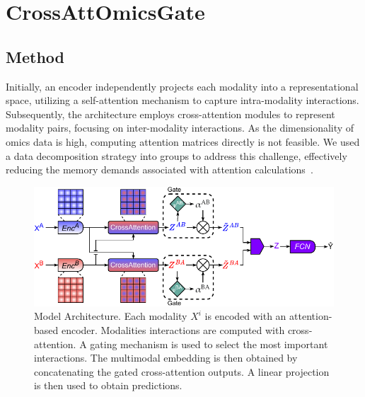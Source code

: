 \documentclass[../main.tex]{subfiles}
\begin{document}
\chapter{CrossAttOmicsGate}\label{chap:crossattomicsgate}
\minitocpage

\section{Method}
	Initially, an encoder independently projects each modality into a representational space, utilizing a self-attention mechanism to capture intra-modality interactions.
	Subsequently, the architecture employs cross-attention modules to represent modality pairs, focusing on inter-modality interactions.
	As the dimensionality of omics data is high, computing attention matrices directly is not feasible.
	We used a data decomposition strategy into groups to address this challenge, effectively reducing the memory demands associated with attention calculations~\cite{AttOmics}.

	\begin{figure}[htbp]
		\centering
		\includegraphics[width=\textwidth]{CrossAttOmicsGate.pdf}
		\caption[CrossAttOmicsGate architecture]{Model Architecture. Each modality \(X^i\) is encoded with an attention-based encoder. Modalities interactions are computed with cross-attention. A gating mechanism is used to select the most important interactions. The multimodal embedding is then obtained by concatenating the gated cross-attention outputs. A linear projection is then used to obtain predictions.}
		\label{fig:arch}
	\end{figure}
\end{document}
